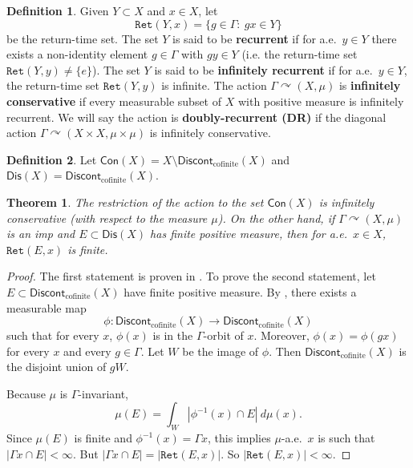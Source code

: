 \documentclass[12pt]{article}
\theoremstyle{plain}
\newtheorem{thm}{Theorem}[section]
\theoremstyle{definition}
\newtheorem{defn}{Definition}
\theoremstyle{remark}
\newcommand{\G}{\Gamma}
\newcommand\Ret{\mathtt{Ret}}
\def\cc{{\curvearrowright}}
\begin{document}
\begin{defn}
Given $Y \subset X$ and $x\in X$, let 
 $$\Ret(Y,x)=\{g\in \G:~ gx \in Y\}$$
 be the return-time set. The set $Y$ is said to be \textbf{recurrent} if for a.e.\ $y\in Y$ there exists a non-identity element $g\in \G$ with $gy \in Y$ (i.e. the return-time set $\Ret(Y,y)\ne \{e\}$). The set $Y$ is said to be  \textbf{infinitely recurrent} if for a.e.\ $y \in Y$, the return-time set $\Ret(Y,y)$ is infinite. The action $\G \cc (X,\mu)$ 
 is \textbf{infinitely conservative} if every measurable subset of $X$ with positive measure is infinitely recurrent.  
 We will say the action is {\bf doubly-recurrent (DR)} if the diagonal action $\G \cc (X\times X,\mu\times\mu)$ is infinitely conservative.
\end{defn}

\begin{defn}
    Let $\mathsf{Con}(X)=X  \setminus \mathsf{Discont}_{\textrm{cofinite}}(X)$ and $\mathsf{Dis}(X) = \mathsf{Discont}_{\textrm{cofinite}}(X)$.
\end{defn}


\begin{thm}\label{T:Kaim-Hopf}
The restriction of the action to the set $  \mathsf{Con}(X)$ is infinitely conservative (with respect to the measure $\mu$). On the other hand, if $\G \cc (X,\mu)$ is an imp and $E \subset \mathsf{Dis}(X)$ has finite positive measure, then for a.e.\ $x\in X$, $\Ret(E,x)$ is finite. 
\end{thm}

\begin{proof}
    The first statement is proven in \cite[Propositions 7 and 8]{MR2731695}. To prove the second statement, let $E \subset \mathsf{Discont}_{\textrm{cofinite}}(X)$ have finite positive measure. By \cite[Lemma 4]{MR2731695}, there exists a measurable map $$\phi:\mathsf{Discont}_{\textrm{cofinite}}(X) \to \mathsf{Discont}_{\textrm{cofinite}}(X)$$ such that for every $x$, $\phi(x)$ is in the $\G$-orbit of $x$. Moreover, $\phi(x)=\phi(gx)$ for every $x$ and every $g\in \G$. Let $W$ be the image of $\phi$. Then $\mathsf{Discont}_{\textrm{cofinite}}(X)$ is the disjoint union of $gW$. 

    Because $\mu$ is $\G$-invariant,
    $$\mu(E) = \int_W |\phi^{-1}(x)\cap E|~d\mu(x).$$
Since $\mu(E)$ is finite and $\phi^{-1}(x)=\G x$, this implies $\mu$-a.e.\ $x$ is such that $|\G x \cap E|<\infty$. But $|\G x\cap E| = |\Ret(E,x)|$. So $|\Ret(E,x)|<\infty$.
\end{proof}
\end{document}
